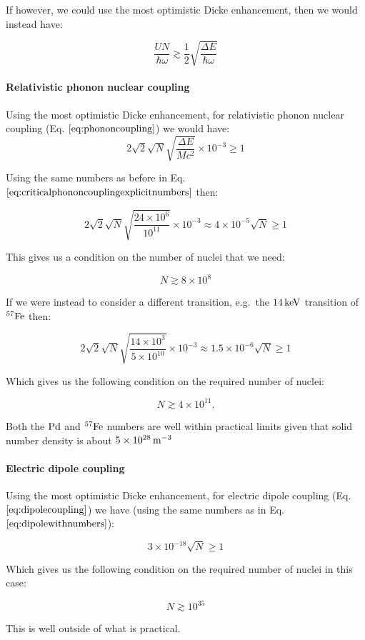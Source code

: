 \documentclass[
]{article}
\renewcommand{\[}{\begin{equation}}
\renewcommand{\]}{\end{equation}}
\begin{document}
If however, we could use the most optimistic Dicke enhancement, then we
would instead have:

\[
\frac{UN}{\hbar\omega} \gtrsim \frac{1}{2}\sqrt{\frac{\Delta E}{\hbar\omega}}
\label{eq:dickesuperradianttransition2}
\]

\paragraph{Relativistic phonon nuclear
coupling}\label{relativistic-phonon-nuclear-coupling-1}

Using the most optimistic Dicke enhancement, for relativistic phonon
nuclear coupling (Eq. \(\ref{eq:phononcoupling}\)) we would have: \[
2\sqrt{2}\sqrt{N} \sqrt{\frac{\Delta E}{M c^2}}  \times 10^{-3} \ge 1
\]

Using the same numbers as before in Eq.
\(\ref{eq:criticalphononcouplingexplicitnumbers}\) then:

\[
2\sqrt{2} \sqrt{N}\sqrt{\frac{24\times10^6}{10^{11}}}  \times 10^{-3} \approx 4 \times 10^{-5} \sqrt{N} \ge 1
\]

This gives us a condition on the number of nuclei that we need:

\[
N \gtrsim 8 \times 10^8
\]

If we were instead to consider a different transition, e.g.~the
\(\rm 14 \, keV\) transition of \(\rm ^{57}Fe\) then:

\[
2\sqrt{2} \sqrt{N}\sqrt{\frac{14\times10^3}{5\times 10^{10}}}  \times 10^{-3} \approx 1.5 \times 10^{-6} \sqrt{N} \ge 1
\]

Which gives us the following condition on the required number of nuclei:

\[
N \gtrsim 4 \times 10^{11}.
\]

Both the \(\rm Pd\) and \(\rm ^{57}Fe\) numbers are well within
practical limits given that solid number density is about
\(5\times 10^{28} \, \rm m^{-3}\)

\paragraph{Electric dipole coupling}\label{electric-dipole-coupling-1}

Using the most optimistic Dicke enhancement, for electric dipole
coupling (Eq. \(\ref{eq:dipolecoupling}\)) we have (using the same
numbers as in Eq. \(\ref{eq:dipolewithnumbers}\)):

\[
3\times 10^{-18}\sqrt{N}  \ge 1
\]

Which gives us the following condition on the required number of nuclei
in this case:

\[
N \gtrsim 10^{35}
\]

This is well outside of what is practical.

\printbibliography
\end{document}
